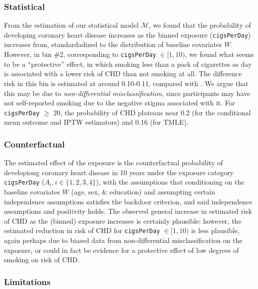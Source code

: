 \documentclass[]{article}
\begin{document}
\subsubsection{Statistical}\label{statistical}

From the estimation of our statistical model \(\mathcal{M}\), we found
that the probability of developing coronary heart disease increases as
the binned exposure (\texttt{cigsPerDay}) increases from, standardadized
to the distribution of baseline covariates \(W\). However, in bin \#2,
corresponding to \texttt{cigsPerDay} \(\in [1, 10)\), we found what
seems to be a ``protective'' effect, in which smoking less than a pack
of cigarettes as day is associated with a lower risk of CHD than not
smoking at all. The difference risk in this bin is estimated at around
0.10-0.11, compared with . We argue that this may be due to
\textit{non-differential misclassification}, since participants may have
not self-reported smoking due to the negative stigma associated with it.
For \texttt{cigsPerDay} \(\geq\) 20, the probability of CHD plateaus
near 0.2 (for the conditional mean outcome and IPTW estimators) and 0.16
(for TMLE).

\subsubsection{Counterfactual}\label{counterfactual}

The estimated effect of the exposure is the counterfactual probability
of developiong coronary heart disease in 10 years under the exposure
category \texttt{cigsPerDay} (\(A_i, i \in \{1, 2, 3, 4 \}\)), with the
assumptions that conditioning on the baseline covariates \(W\) (age,
sex, \& education) and assumpting certain independence assumptions
satisfies the backdoor criterion, and said independence assumptions and
positivity holds. The observed general increase in estimated risk of CHD
as the (binned) exposure increases is certainly plausible; however, the
estimated reduction in risk of CHD for \texttt{cigsPerDay}
\(\in [1, 10)\) is less plausible, again perhaps due to biased data from
non-differential misclassification on the exposure, or could in fact be
evidence for a protective effect of low degrees of smoking on risk of
CHD.

\subsubsection{Limitations}\label{limitations}
\end{document}
